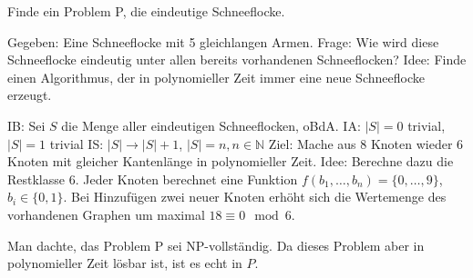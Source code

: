 ﻿\documentclass[preview, border=4pt]{standalone}
\begin{document}

Finde ein Problem P, die eindeutige Schneeflocke.

Gegeben: Eine Schneeflocke mit 5 gleichlangen Armen. \newline
Frage: Wie wird diese Schneeflocke eindeutig unter allen bereits vorhandenen Schneeflocken? \newline
Idee: Finde einen Algorithmus, der in polynomieller Zeit immer eine neue Schneeflocke erzeugt.

IB: Sei $S$ die Menge aller eindeutigen Schneeflocken, oBdA.\newline
IA: $|S| = 0$ trivial, $|S| = 1$ trivial\newline
IS: $|S| \rightarrow |S| + 1$, $|S| = n, n \in \mathbb{N}$\newline
Ziel: Mache aus 8 Knoten wieder 6 Knoten mit gleicher Kantenlänge in polynomieller Zeit.\newline
Idee: Berechne dazu die Restklasse 6.\newline
Jeder Knoten berechnet eine Funktion $f(b_1, \ldots, b_n) = \{0, \ldots, 9\}$, $b_i \in \{0, 1\}$.\newline
Bei Hinzufügen zwei neuer Knoten erhöht sich die Wertemenge des vorhandenen Graphen um maximal $18\equiv 0 \mod 6$.

Man dachte, das Problem P sei NP-vollständig. Da dieses Problem aber in polynomieller Zeit lösbar ist, ist es echt in $P$. 
\end{document}
